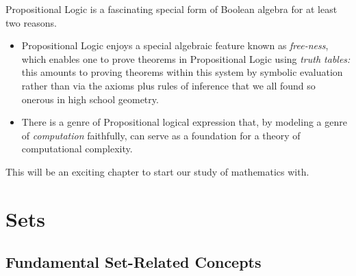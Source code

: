 \begin{itemize}
Propositional Logic is a fascinating special form of Boolean algebra
for at least two reasons.
  \begin{itemize}
  \item
Propositional Logic enjoys a special algebraic feature known as {\it
  free-ness}, which enables one to prove theorems in Propositional
Logic using {\em truth tables:} this amounts to proving theorems
within this system by symbolic evaluation rather than via the axioms
plus rules of inference that we all found so onerous in high school
geometry.
  \item
There is a genre of Propositional logical expression that, by modeling
a genre of {\em computation} faithfully, can serve as a foundation for
a theory of computational complexity.
  \end{itemize}
\end{itemize}


\medskip

This will be an exciting chapter to start our study of mathematics with.

\section{Sets}
\label{sec:sets}

\subsection{Fundamental Set-Related Concepts}
\label{sec:set-concepts}

